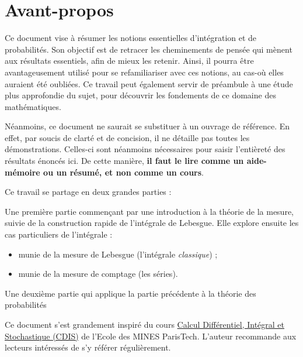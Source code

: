 \documentclass[../integ-proba.tex]{subfiles}
\begin{document}
  \chapter*{Avant-propos}

  Ce document vise à résumer les notions essentielles d'intégration et de probabilités.
  Son objectif est de retracer les cheminements de pensée qui mènent aux résultats essentiels, afin de mieux les retenir.
  Ainsi, il pourra être avantageusement utilisé pour se refamiliariser avec ces notions, au cas-où elles auraient été oubliées.
  Ce travail peut également servir de préambule à une étude plus approfondie du sujet, pour découvrir les fondements de ce domaine des mathématiques.

  Néanmoins, ce document ne saurait se substituer à un ouvrage de référence. En effet, par soucis de clarté et de concision, il ne détaille pas toutes les démonstrations.
  Celles-ci sont néanmoins nécessaires pour saisir l'entièreté des résultats énoncés ici. De cette manière, \textbf{il faut le lire comme un aide-mémoire ou un résumé, et non comme un cours}.

  \bigskip

  Ce travail se partage en deux grandes parties :
  \begin{itemize}
    \itemb Une première partie commençant par une introduction à la théorie de la mesure, suivie de la construction rapide de l'intégrale de Lebesgue.
    Elle explore ensuite les cas particuliers de l'intégrale :
    \begin{itemize}
      \item munie de la mesure de Lebesgue (l'intégrale \textit{classique}) ;
      \item munie de la mesure de comptage (les séries).
    \end{itemize}
    \itemb Une deuxième partie qui applique la partie précédente à la théorie des probabilités
  \end{itemize}

  \bigskip

  Ce document s'est grandement inspiré du cours \href{https://github.com/boisgera/CDIS}{Calcul Différentiel, Intégral et Stochastique (CDIS)} de l'Ecole des MINES ParisTech.
  L'auteur recommande aux lecteurs intéressés de s'y référer régulièrement.
\end{document}
